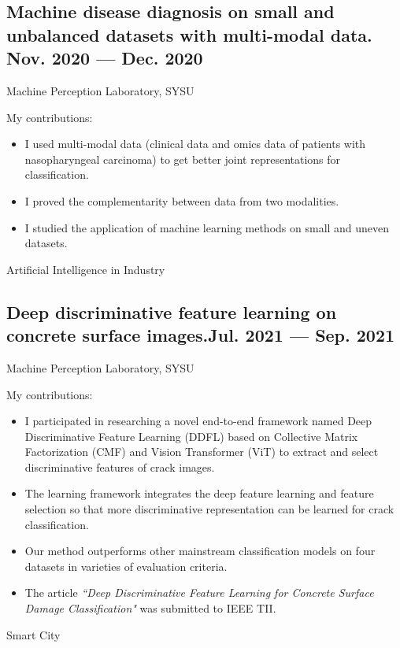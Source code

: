 \documentclass[a4,11pt]{article}
\newcommand{\subtext}[1]{
#1\par\vspace{-0.2cm}}
\begin{document}
\subsection*{Machine disease diagnosis on small and unbalanced datasets with multi-modal data. \hfill Nov. 2020 --- Dec. 2020} 
\subtext{Machine Perception Laboratory, SYSU} 
\vspace {6pt}
My contributions:
    \begin{itemize}[topsep = 0 pt, itemsep = 0 pt, parsep = 1 pt]
        \item I used multi-modal data (clinical data and omics data of patients with nasopharyngeal carcinoma) to get better joint representations for classification. 
		\item I proved the complementarity between data from two modalities.
		\item I studied the application of machine learning methods on small and uneven datasets. 
    \end{itemize}
\vspace {12pt}

\centerline{\textcolor{UI_blue}{Artificial Intelligence in Industry}}
\vspace {-10pt}
\subsection*{Deep discriminative feature learning on concrete surface images.\hfill Jul. 2021 --- Sep. 2021} 
\subtext{Machine Perception Laboratory, SYSU } 
\vspace {6pt}
My contributions:
    \begin{itemize}[topsep = 0 pt, itemsep = 0 pt, parsep = 1 pt]
		\item I participated in researching a novel end-to-end framework named Deep Discriminative Feature Learning (DDFL) based on Collective Matrix Factorization (CMF) and Vision Transformer (ViT) to extract and select discriminative features of crack images. 
		\item The learning framework integrates the deep feature learning and feature selection so that more
discriminative representation can be learned for crack classification.
		\item  Our method outperforms other mainstream classification models on four datasets in varieties of evaluation criteria.
		\item The article  \textit{``Deep Discriminative Feature Learning for Concrete Surface Damage Classification"} was submitted to IEEE TII.
    \end{itemize}

\vspace {6pt}

\centerline{\textcolor{UI_blue}{Smart City}}
\vspace {-12pt}
\end{document}
